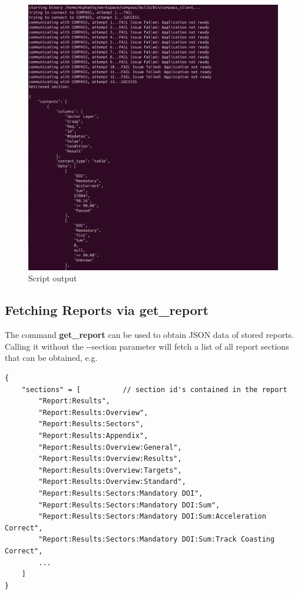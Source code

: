 \begin{figure}[H]
    \hspace*{-2.5cm}
    \includegraphics[width=18cm,frame]{figures/script_result.png}
  \caption{Script output}
\end{figure}

\subsection{Fetching Reports via get\_report}
\label{sec:get_report}

The command \textbf{get\_report} can be used to obtain JSON data of stored reports. \\

Calling it without the -{}-section parameter will fetch a list of all report sections that can be obtained, e.g.

\begin{lstlisting}[basicstyle=\tiny\ttfamily]
{
    "sections" = [          // section id's contained in the report
        "Report:Results",
        "Report:Results:Overview",
        "Report:Results:Sectors",
        "Report:Results:Appendix",
        "Report:Results:Overview:General",
        "Report:Results:Overview:Results",
        "Report:Results:Overview:Targets",
        "Report:Results:Overview:Standard",
        "Report:Results:Sectors:Mandatory DOI",
        "Report:Results:Sectors:Mandatory DOI:Sum",
        "Report:Results:Sectors:Mandatory DOI:Sum:Acceleration Correct",
        "Report:Results:Sectors:Mandatory DOI:Sum:Track Coasting Correct",
        ...
    ]
}
\end{lstlisting}

